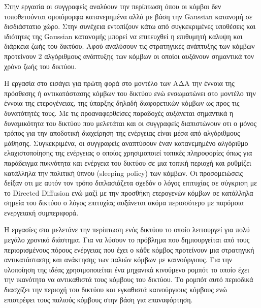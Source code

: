 Στην εργασία \cite{gaussian_sensors} οι συγγραφείς αναλύουν την περίπτωση όπου οι κόμβοι δεν τοποθετούνται ομοιόμορφα κατανεμημένα αλλά με βάση την Gaussian κατανομή
σε δισδιάστατιο χώρο. Στην συνέχεια εντοπίζουν κάτω από συγκεκριμένες υποθέσεις και ιδιότητες της Gaussian κατανομής μπορεί να επιτευχθεί η επιθυμητή καλυψη και
διάρκεια ζωής του δικτύου. Αφού αναλύσουν τις στρατηγικές ανάπτυξης των κόμβων προτείνουν 2 αλγόριθμους ανάπτυξης των κόμβων οι οποίοι αυξάνουν σημαντικά τον χρόνο
ζωής του δικτύου.

Η εργασία στο \cite{sens_deployment3} εισάγει για πρώτη φορά στο μοντέλο των ΑΔΑ την έννοια της πρόσθεσης ή αντικατάστασης κόμβων του δικτύου ενώ ενσωματώνει στο
μοντέλο την έννοια της ετερογένειας, της ύπαρξης δηλαδή διαφορετικών κόμβων ως προς τις δυνατότητές τους. Με τις προαναφερθείσες παραδοχές αυξάνεται σημαντικά η
δυναμικότητα του δικτύου που μελετάται και οι συγγραφείς διαπιστώνουν οτι ο μόνος τρόπος για την αποδοτική διαχείρηση της ενέργειας είναι μέσα από αλγόριθμους
μάθησης. Συγκεκριμένα, οι συγγραφείς αναπτύσουν έναν κατανεμημένο αλγόριθμο ελαχιστοποίησης της ενέργειας ο οποίος χρησιμοποιεί τοπικές πληροφορίες όπως για
παράδειγμα πυκνότητα και ενέργεια του δικτύου σε μια τοπική περιοχή και ρυθμίζει κατάλληλα την πολιτική ύπνου (sleeping policy) των κόμβων. Οι προσομειώσεις δείξαν
οτι με αυτόν τον τρόπο διπλασιάζετα σχεδόν ο λόγος επιτυχίας σε σύγκριση με το Directed Diffusion ενώ μαζί με την προσθήκη ετερογενών κόμβων σε κατάλληλα σημεία του
δικτύου ο λόγος επιτυχίας αυξάνεται ακόμα περισσότερο με παρόμοια ενεργειακή συμπεριφορά.

Η εργασίες στα \cite{sens_deployment1} \cite{sens_deployment2} μελετάνε την περίπτωση ενός δικτύου το οποίο λειτουργεί για πολύ μεγάλο χρονικό διάστημα. Για να
λύσουν το πρόβλημα που δημιουργείται από τους περιορισμένους πόρους ενέργειας που έχει ο κάθε κόμβος προτείνουν μια στρατηγική αντικατάστασης και ανάκτησης των παλιών
κόμβων με καινούργιους. Για την υλοποίηση της ιδέας χρησιμοποιείται ένα μηχανικά κινούμενο ρομπότ το οποίο έχει την ικανότητα να αντικαθιστά τους κόμβους του
δικτύου. Το ρομπότ αυτό περιοδικά διασχίζει την περιοχή του δικτύου και εγκαθιστά καινούργιους κόμβους ενώ επιστρέφει τους παλιούς κόμβους στην βάση για επαναφόρτηση.


